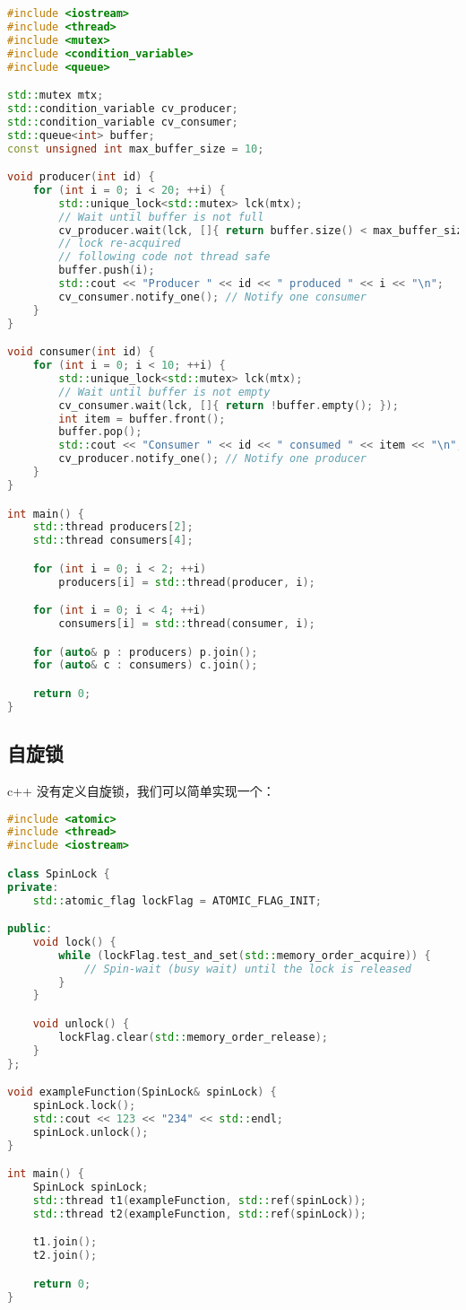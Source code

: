 \begin{lstlisting}[language=cpp]
#include <iostream>
#include <thread>
#include <mutex>
#include <condition_variable>
#include <queue>

std::mutex mtx;
std::condition_variable cv_producer;
std::condition_variable cv_consumer;
std::queue<int> buffer;
const unsigned int max_buffer_size = 10;

void producer(int id) {
    for (int i = 0; i < 20; ++i) {
        std::unique_lock<std::mutex> lck(mtx);
        // Wait until buffer is not full
        cv_producer.wait(lck, []{ return buffer.size() < max_buffer_size; });
        // lock re-acquired
        // following code not thread safe
        buffer.push(i);
        std::cout << "Producer " << id << " produced " << i << "\n";
        cv_consumer.notify_one(); // Notify one consumer
    }
}

void consumer(int id) {
    for (int i = 0; i < 10; ++i) {
        std::unique_lock<std::mutex> lck(mtx);
        // Wait until buffer is not empty
        cv_consumer.wait(lck, []{ return !buffer.empty(); });
        int item = buffer.front();
        buffer.pop();
        std::cout << "Consumer " << id << " consumed " << item << "\n";
        cv_producer.notify_one(); // Notify one producer
    }
}

int main() {
    std::thread producers[2];
    std::thread consumers[4];

    for (int i = 0; i < 2; ++i)
        producers[i] = std::thread(producer, i);

    for (int i = 0; i < 4; ++i)
        consumers[i] = std::thread(consumer, i);

    for (auto& p : producers) p.join();
    for (auto& c : consumers) c.join();

    return 0;
}
\end{lstlisting}

\subsection{自旋锁}
c++ 没有定义自旋锁，我们可以简单实现一个：
\begin{lstlisting}[language=cpp]
#include <atomic>
#include <thread>
#include <iostream>

class SpinLock {
private:
    std::atomic_flag lockFlag = ATOMIC_FLAG_INIT;

public:
    void lock() {
        while (lockFlag.test_and_set(std::memory_order_acquire)) {
            // Spin-wait (busy wait) until the lock is released
        }
    }

    void unlock() {
        lockFlag.clear(std::memory_order_release);
    }
};

void exampleFunction(SpinLock& spinLock) {
    spinLock.lock();
    std::cout << 123 << "234" << std::endl;
    spinLock.unlock();
}

int main() {
    SpinLock spinLock;
    std::thread t1(exampleFunction, std::ref(spinLock));
    std::thread t2(exampleFunction, std::ref(spinLock));

    t1.join();
    t2.join();

    return 0;
}
\end{lstlisting}
